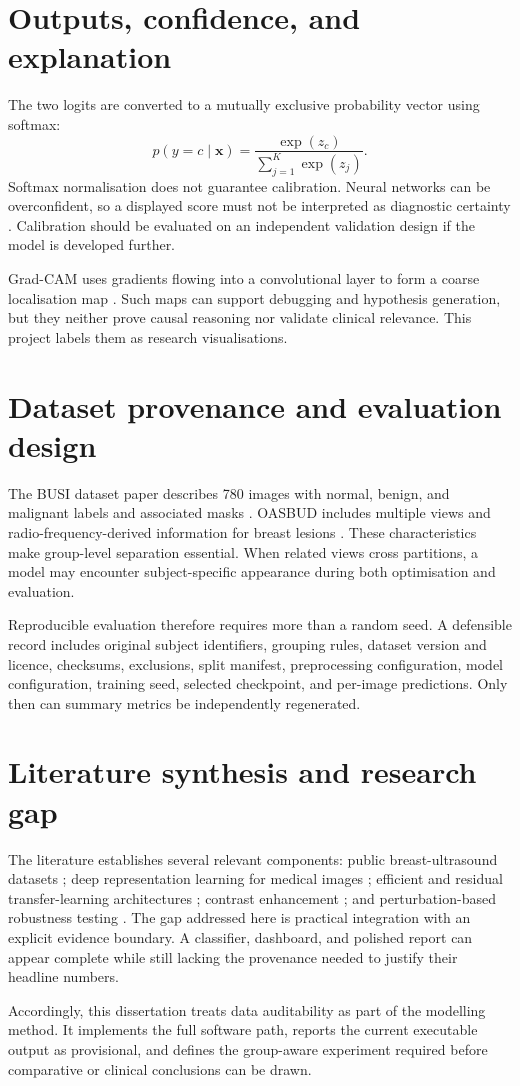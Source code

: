\section{Outputs, confidence, and explanation}
The two logits are converted to a mutually exclusive probability vector using softmax:
\begin{equation}
p(y=c\mid\mathbf{x})=\frac{\exp(z_c)}{\sum_{j=1}^{K}\exp(z_j)}.
\end{equation}
Softmax normalisation does not guarantee calibration. Neural networks can be overconfident, so a displayed score must not be interpreted as diagnostic certainty \citep{Guo2017}. Calibration should be evaluated on an independent validation design if the model is developed further.

Grad-CAM uses gradients flowing into a convolutional layer to form a coarse localisation map \citep{Selvaraju2017}. Such maps can support debugging and hypothesis generation, but they neither prove causal reasoning nor validate clinical relevance. This project labels them as research visualisations.

\section{Dataset provenance and evaluation design}
The BUSI dataset paper describes 780 images with normal, benign, and malignant labels and associated masks \citep{AlDhabyani2020}. OASBUD includes multiple views and radio-frequency-derived information for breast lesions \citep{Piotrzkowska2017}. These characteristics make group-level separation essential. When related views cross partitions, a model may encounter subject-specific appearance during both optimisation and evaluation.

Reproducible evaluation therefore requires more than a random seed. A defensible record includes original subject identifiers, grouping rules, dataset version and licence, checksums, exclusions, split manifest, preprocessing configuration, model configuration, training seed, selected checkpoint, and per-image predictions. Only then can summary metrics be independently regenerated.

\section{Literature synthesis and research gap}
The literature establishes several relevant components: public breast-ultrasound datasets \citep{AlDhabyani2020,Piotrzkowska2017}; deep representation learning for medical images \citep{Litjens2017,Cheng2016}; efficient and residual transfer-learning architectures \citep{He2016,Tan2019}; contrast enhancement \citep{Zuiderveld1994}; and perturbation-based robustness testing \citep{Jiang2023}. The gap addressed here is practical integration with an explicit evidence boundary. A classifier, dashboard, and polished report can appear complete while still lacking the provenance needed to justify their headline numbers.

Accordingly, this dissertation treats data auditability as part of the modelling method. It implements the full software path, reports the current executable output as provisional, and defines the group-aware experiment required before comparative or clinical conclusions can be drawn.
